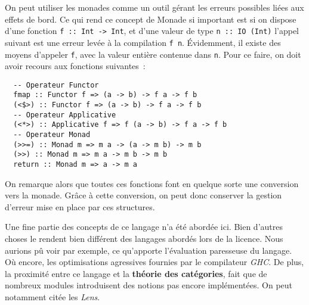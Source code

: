 On peut utiliser les monades comme un outil gérant les erreurs possibles liées 
aux effets de bord. Ce qui rend ce concept de Monade si 
important est si on dispose d'une fonction 
\texttt{f :: Int -> Int}, et d'une valeur de type 
\texttt{n :: IO (Int)} l'appel suivant est une erreur levée à la 
compilation \texttt{f n}. Évidemment, il existe des moyens 
d'appeler \texttt{f}, avec la valeur entière contenue dans 
\texttt{n}. Pour ce faire, on doit avoir recours aux fonctions 
suivantes~: 

\begin{verbatim}
  -- Operateur Functor
  fmap :: Functor f => (a -> b) -> f a -> f b
  (<$>) :: Functor f => (a -> b) -> f a -> f b
  -- Operateur Applicative
  (<*>) :: Applicative f => f (a -> b) -> f a -> f b
  -- Operateur Monad
  (>>=) :: Monad m => m a -> (a -> m b) -> m b
  (>>) :: Monad m => m a -> m b -> m b
  return :: Monad m => a -> m a
\end{verbatim}

On remarque alors que toutes ces fonctions font en quelque sorte une conversion 
vers la monade. Grâce à cette conversion, on peut donc conserver la gestion 
d'erreur mise en place par ces structures.

Une fine partie des concepts de ce langage n'a été abordée ici. Bien d'autres 
choses le rendent bien différent des langages abordés lors de la licence. Nous 
aurions pû voir par exemple, ce qu'apporte l'évaluation paresseuse du langage. 
Où encore, les optimisations agressives fournies par le compilateur 
\textit{GHC}. De plus, la proximité entre ce langage et la 
\textbf{théorie des catégories}, fait que de nombreux modules introduisent des 
notions pas encore implémentées. On peut notamment citée les 
\textit{Lens}\cite{lensHaskell}.